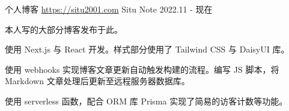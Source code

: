 
\begin{cventries}



\cventry
    {个人博客 \href{https://situ2001.com}{https://situ2001.com}} %
    {Situ Note} %
    {} %
    {2022.11 - 现在} %
    {
    \begin{cvitems} %
        \item {本人写的大部分博客发布于此。}
        \item {使用 Next.js 与 React 开发。样式部分使用了 Tailwind CSS 与 DaisyUI 库。}
        \item {使用 webhooks 实现博客文章更新自动触发构建的流程。编写 JS 脚本，将 Markdown 文章处理后更新至远程服务器数据库。}
        \item {使用 serverless 函数，配合 ORM 库 Prisma 实现了简易的访客计数等功能。}
    \end{cvitems}
    }

\end{cventries}
